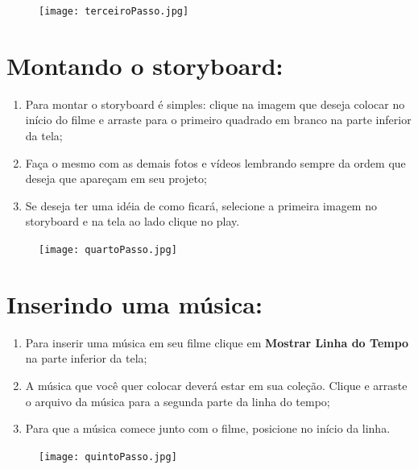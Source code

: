 \documentclass{article}
\begin{document}
{\begin{figure}[h!]
\centering
\texttt{[image: terceiroPasso.jpg]}
\end{figure}

\newpage

\section{Montando o storyboard:}
\begin{enumerate}
\item Para montar o storyboard é simples: clique na imagem que deseja colocar no início do filme e arraste para o primeiro quadrado em branco na parte inferior da tela;
\item Faça o mesmo com as demais fotos e vídeos lembrando sempre da ordem que deseja que apareçam em seu projeto;
\item Se deseja ter uma idéia de como ficará, selecione a primeira imagem no storyboard e na tela ao lado clique no play.
\end{enumerate}

\begin{figure}[h!]
\centering
\texttt{[image: quartoPasso.jpg]}
\end{figure}

\newpage

\section{Inserindo uma música:}
\begin{enumerate}
\item Para inserir uma música em seu filme clique em \textbf{Mostrar Linha do Tempo} na parte inferior da tela;
\item A música que você quer colocar deverá estar em sua coleção. Clique e arraste o arquivo da música para a segunda parte da linha do tempo;
\item Para que a música comece junto com o filme, posicione no início da linha.
\end{enumerate}

\begin{figure}[h!]
\centering
\texttt{[image: quintoPasso.jpg]}
\end{figure}

\newpage

}
\end{document}
